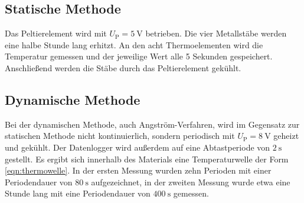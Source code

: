 \subsection{Statische Methode}
\label{sec:statische Methode}
Das Peltierelement wird mit $U_\text{P}=\SI{5}{\volt}$ betrieben.
Die vier Metallstäbe werden eine halbe Stunde lang erhitzt.
An den acht Thermoelementen wird die Temperatur gemessen und der jeweilige Wert alle 5 Sekunden gespeichert.
Anschließend werden die Stäbe durch das Peltierelement gekühlt.
%
\subsection{Dynamische Methode}
\label{sec:dynamische Methode}
Bei der dynamischen Methode, auch Angström-Verfahren, wird im Gegensatz zur statischen Methode nicht kontinuierlich,
sondern periodisch mit $U_\text{P}=\SI{8}{\volt}$ geheizt und gekühlt.
Der Datenlogger wird außerdem auf eine Abtastperiode von $\SI{2}{\second}$ gestellt.
Es ergibt sich innerhalb des Materials eine Temperaturwelle der Form \eqref{eqn:thermowelle}.
In der ersten Messung wurden zehn Perioden mit einer Periodendauer von $\SI{80}{\second}$ aufgezeichnet,
in der zweiten Messung wurde etwa eine Stunde lang mit eine Periodendauer von $\SI{400}{\second}$ gemessen.
